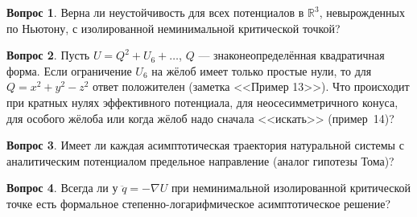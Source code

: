 \documentclass[11pt,a4paper]{article}
\theoremstyle{definition}
\newtheorem{question}{Вопрос}
\newcommand{\R}{\mathbb R}
\begin{document}
\begin{question} Верна ли неустойчивость для всех потенциалов в $\R^3$, невырожденных по Ньютону, с изолированной
неминимальной критической точкой?\end{question}
\begin{question} Пусть $U=Q^2+U_6+\dots$, $Q$ --- знаконеопределённая квадратичная форма. Если ограничение $U_6$
на жёлоб имеет только простые нули, то для $Q=x^2+y^2-z^2$ ответ положителен (заметка <<Пример 13>>).
Что происходит при кратных нулях эффективного потенциала, для неосесимметричного конуса, для особого жёлоба
или когда жёлоб надо сначала <<искать>> (пример~14)?\end{question}
\begin{question} Имеет ли каждая асимптотическая траектория натуральной системы с аналитическим потенциалом
предельное направление (аналог гипотезы Тома)?\end{question}
\begin{question} Всегда ли у $\ddot q=-\nabla U$ при неминимальной изолированной критической точке есть формальное
степенно-логарифмическое асимптотическое решение?\end{question}

\end{document}
